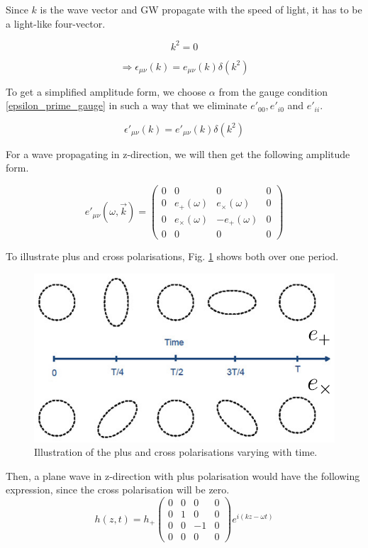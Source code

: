 Since $k$ is the wave vector and GW propagate with the speed of light, it has to be a light-like four-vector.

\begin{equation}
    k^2=0
\end{equation}

\begin{equation}
    \Rightarrow \epsilon_{\mu\nu}(k) = e_{\mu\nu} (k)\delta(k^2)
\end{equation}

To get a simplified amplitude form, we choose $\alpha$ from the gauge condition \ref{epsilon_prime_gauge} in such a way that we eliminate $e'_{00}, e'_{i0}$ and $e'_{ii}$. 

\begin{equation}
    \epsilon '_{\mu\nu}(k) = e'_{\mu\nu} (k)\delta(k^2) 
\end{equation}

For a wave propagating in z-direction, we will then get the following amplitude form.

\begin{equation}
    e'_{\mu\nu}(\omega, \vec{k})=
    \begin{pmatrix}
        0 & 0 & 0 & 0 \\
        0 & e_+(\omega) & e_\times(\omega) & 0 \\ 
        0 & e_\times(\omega) & -e_+(\omega) & 0 \\
        0 & 0 & 0 & 0
    \end{pmatrix}
\end{equation}

To illustrate plus and cross polarisations, Fig. \ref{polarisation} shows both over one period.

\begin{figure}[h]
    \centering
    \includegraphics[width=0.4\linewidth]{Images/polarisations.png}
    \caption{Illustration of the plus and cross polarisations varying with time.}
    \label{polarisation}
\end{figure} 


Then, a plane wave in z-direction with plus polarisation would have the following expression, since the cross polarisation will be zero.
\begin{equation}
    h(z, t) = h_+ 
    \begin{pmatrix}
        0 & 0 & 0 & 0 \\
        0 &1 & 0 & 0 \\
        0 & 0 & -1 & 0 \\
        0 &  0 & 0 & 0
    \end{pmatrix}
    e^{i(k z-\omega t)}
\end{equation}

